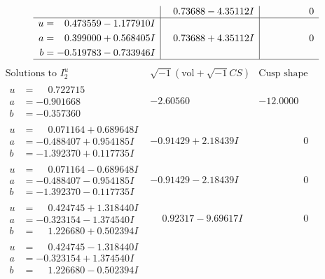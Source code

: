 \documentclass[1p]{elsarticle_modified}
\theoremstyle{definition}
\newcommand{\I}{\sqrt{-1}}
\begin{document}
$$\begin{array}{c|c|c}
 & \phantom{-}0.73688 - 4.35112 I & \phantom{-0.000000 } 0 \\ \hline\begin{aligned}
u &= \phantom{-}0.473559 - 1.177910 I \\
a &= \phantom{-}0.399000 + 0.568405 I \\
b &= -0.519783 - 0.733946 I\end{aligned}
 & \phantom{-}0.73688 + 4.35112 I & \phantom{-0.000000 } 0\\
 \hline 
 \end{array}$$\newpage$$\begin{array}{c|c|c}  
\text{Solutions to }I^u_{2}& \I (\text{vol} + \sqrt{-1}CS) & \text{Cusp shape}\\
 \hline 
\begin{aligned}
u &= \phantom{-}0.722715\phantom{ +0.000000I} \\
a &= -0.901668\phantom{ +0.000000I} \\
b &= -0.357360\phantom{ +0.000000I}\end{aligned}
 & -2.60560\phantom{ +0.000000I} & -12.0000\phantom{ +0.000000I} \\ \hline\begin{aligned}
u &= \phantom{-}0.071164 + 0.689648 I \\
a &= -0.488407 + 0.954185 I \\
b &= -1.392370 + 0.117735 I\end{aligned}
 & -0.91429 + 2.18439 I & \phantom{-0.000000 } 0 \\ \hline\begin{aligned}
u &= \phantom{-}0.071164 - 0.689648 I \\
a &= -0.488407 - 0.954185 I \\
b &= -1.392370 - 0.117735 I\end{aligned}
 & -0.91429 - 2.18439 I & \phantom{-0.000000 } 0 \\ \hline\begin{aligned}
u &= \phantom{-}0.424745 + 1.318440 I \\
a &= -0.323154 - 1.374540 I \\
b &= \phantom{-}1.226680 + 0.502394 I\end{aligned}
 & \phantom{-}0.92317 - 9.69617 I & \phantom{-0.000000 } 0 \\ \hline\begin{aligned}
u &= \phantom{-}0.424745 - 1.318440 I \\
a &= -0.323154 + 1.374540 I \\
b &= \phantom{-}1.226680 - 0.502394 I\end{aligned}

\end{array}$$
\end{document}
